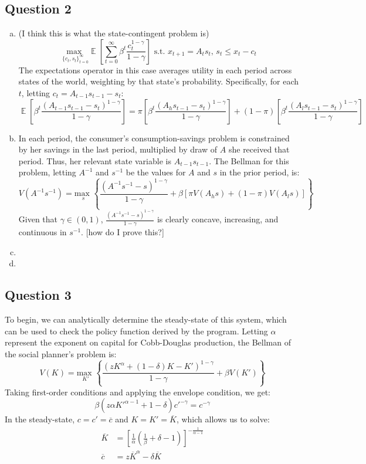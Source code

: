 \documentclass{article}
\newcommand{\usmax}[1]{\underset{#1}{\text{max }}}
\newcommand{\zinf}{_{t=0}^\infty}
\newcommand{\aneg}{A^{-1}}
\newcommand{\sneg}{s^{-1}}
\DeclareMathOperator{\E}{\mathbb{E}} %
\begin{document}
\subsection*{Question 2}

\begin{enumerate}[(a)]
	\item (I think this is what the state-contingent problem is)
		\[
			\usmax{\{c_t,s_t\}\zinf}\E\left[\sum\zinf\beta^t\frac{c_t^{1-\gamma}}{1-\gamma}\right]\text{ s.t. }x_{t+1}= A_ts_t\text{, }s_t\leq x_t-c_t
		\]
		The expectations operator in this case averages utility in each period across states of the world, weighting by that state's probability. Specifically, for each $t$, letting $c_t = A_{t-1}s_{t-1} - s_t$:
		\[
			\E\left[\beta^t\frac{(A_{t-1}s_{t-1} - s_t)^{1-\gamma}}{1-\gamma}\right] = \pi\left[\beta^t\frac{(A_hs_{t-1} - s_t)^{1-\gamma}}{1-\gamma}\right] + (1-\pi)\left[\beta^t\frac{(A_ls_{t-1} - s_t)^{1-\gamma}}{1-\gamma}\right] 
		\]
		
	\item In each period, the consumer's consumption-savings problem is constrained by her savings in the last period, multiplied by draw of $A$ she received that period. Thus, her relevant state variable is $A_{t-1}s_{t-1}$. The Bellman for this problem, letting $A^{-1}$ and $s^{-1}$ be the values for $A$ and $s$ in the prior period, is:
		\[
			V(A^{-1}s^{-1}) = \usmax{s}\left\{ \frac{\left(\aneg\sneg-s\right)^{1-\gamma}}{1-\gamma} + \beta\left[\pi V(A_hs) + (1-\pi)V(A_ls)\right] \right\}
		\]
		Given that $\gamma\in(0,1)$, $\frac{\left(\aneg\sneg-s\right)^{1-\gamma}}{1-\gamma}$ is clearly concave, increasing, and continuous in $\sneg$. [how do I prove this?]
	
	\item 
	
	\item 
	
\end{enumerate}

\subsection*{Question 3}
To begin, we can analytically determine the steady-state of this system, which can be used to check the policy function derived by the program. Letting $\alpha$ represent the exponent on capital for Cobb-Douglas production, the Bellman of the social planner's problem is:
\[
	V(K) = \usmax{K'}\left\{\frac{\left(zK^\alpha + (1-\delta)K -K'\right)^{1-\gamma}}{1-\gamma} + \beta V(K')\right\}
\]
Taking first-order conditions and applying the envelope condition, we get:
\[
	\beta\left(z\alpha K'^{\alpha-1}+1-\delta\right)c'^{-\gamma} = c^{-\gamma}
\]
In the steady-state, $c=c'=\overline{c}$ and $K=K'=\overline{K}$, which allows us to solve:
\begin{align*}
	\overline{K} &= \left[\frac{1}{\alpha}\left(\frac{1}{\beta} + \delta - 1\right)\right]^{-\frac{1}{\alpha-1}}	\\
	\overline{c} &= z\overline{K}^\alpha - \delta\overline{K}
\end{align*}
\end{document}

